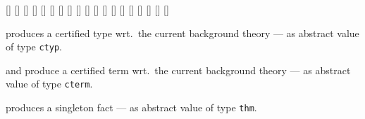 \begin{isabellebody}
\begin{isamarkuptext}
  \begin{railoutput}
[]
[]
\rail@end
{}
[]
[]
\rail@end
{}
[]
[]
\rail@end
{}
[]
[]
\rail@end
{}
[]
[]
\rail@end
{}
[]
\rail@bar
{}
[]
[]
[]
\rail@endbar
\rail@plus
\rail@plus
{}[]
\rail@endplus
{}
[]
\rail@endplus
{}
[]
[]
\rail@bar
{}
[]
\rail@endbar
\rail@end
\end{railoutput}


  \begin{description}

  \item {} produces a certified type wrt.\ the
  current background theory --- as abstract value of type \verb|ctyp|.

  \item {} and  produce a
  certified term wrt.\ the current background theory --- as abstract
  value of type \verb|cterm|.

  \item {} produces a singleton fact --- as abstract
  value of type \verb|thm|.


\end{description}
\end{isamarkuptext}
\end{isabellebody}
